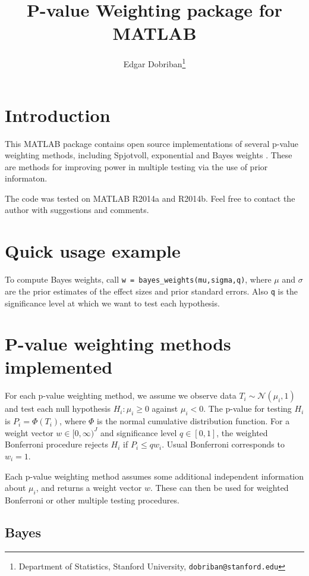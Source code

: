 \documentclass[english,11pt]{article} %
\title{P-value Weighting package for MATLAB}
\author{Edgar Dobriban\thanks{Department of Statistics, Stanford University, \texttt{dobriban@stanford.edu}} }
\begin{document}
\maketitle
\tableofcontents
\section{Introduction}

This MATLAB package contains open source implementations of several p-value weighting methods, including Spjotvoll, exponential and Bayes weights \citep[proposed in][]{dobriban2015optimal}. These are methods for improving power in multiple testing via the use of prior informaton. 

The code was tested on MATLAB R2014a and R2014b. Feel free to contact the author with suggestions and comments.

\section{Quick usage example}


To compute Bayes weights, call \verb+w = bayes_weights(mu,sigma,q)+, where $\mu$ and $\sigma$ are the prior estimates of the effect sizes and prior standard errors. Also \verb+q+ is the significance level at which we want to test each hypothesis.

\section{P-value weighting methods implemented}


For each p-value weighting method, we assume we observe data $T_i \sim \mathcal{N}(\mu_i, 1)$ and test each null hypothesis $H_i: \mu_i \ge 0$ against $\mu_i <0$.  The p-value for testing $H_i$ is $P_i = \Phi(T_i)$, where $\Phi$ is the normal cumulative distribution function.  For a weight vector $w \in [0,\infty)^{J}$ and significance level $q \in [0,1]$, the weighted Bonferroni procedure rejects $H_{i}$ if $P_i \le q w_i$. Usual Bonferroni corresponds to $w_i=1$.

Each p-value weighting method assumes some additional independent information about $\mu_i$, and returns a weight vector $w$. These can then be used for weighted Bonferroni or other multiple testing procedures.

\subsection{Bayes}
\end{document}
